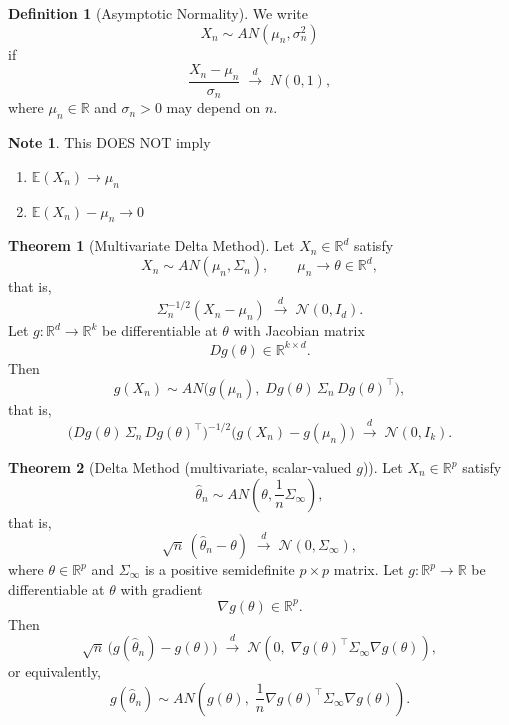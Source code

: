 \documentclass[11pt]{article}
\theoremstyle{definition}
\newtheorem{defn}{Definition}[section]
\newtheorem{note}{Note}[section]
\newtheorem{theo}{Theorem}[section]
\begin{document}
\begin{defn}[Asymptotic Normality]
We write
\[
X_n \sim AN(\mu_n, \sigma_n^2)
\]
if
\[
\frac{X_n - \mu_n}{\sigma_n}
\;\xrightarrow{d}\; N(0,1),
\]
where $\mu_n \in \mathbb{R}$ and $\sigma_n > 0$ may depend on $n$.
\end{defn}
\begin{note}
    This DOES NOT imply
    \begin{enumerate}
        \item $\mathbb{E}(X_n)\rightarrow\mu_n$
        \item $\mathbb{E}(X_n)-\mu_n\rightarrow0$
    \end{enumerate}
\end{note}
\begin{theo}[Multivariate Delta Method]
Let $X_n \in \mathbb{R}^d$ satisfy
\[
X_n\sim AN(\mu_n, \Sigma_n),
\qquad \mu_n \to \theta \in \mathbb{R}^d,
\]
that is,
\[
\Sigma_n^{-1/2}(X_n - \mu_n)
\;\xrightarrow{d}\; \mathcal{N}(0, I_d).
\]
Let $g:\mathbb{R}^d \to \mathbb{R}^k$ be differentiable at $\theta$ with Jacobian matrix
\[
Dg(\theta) \in \mathbb{R}^{k \times d}.
\]
Then
\[
g(X_n) \sim AN\!\big( g(\mu_n), \; Dg(\theta)\, \Sigma_n \, Dg(\theta)^\top \big),
\]
that is,
\[
\big( Dg(\theta)\, \Sigma_n \, Dg(\theta)^\top \big)^{-1/2}
\big( g(X_n) - g(\mu_n) \big)
\;\xrightarrow{d}\; \mathcal{N}(0, I_k).
\]
\end{theo}

\begin{theo}[Delta Method (multivariate, scalar-valued $g$)]
Let $X_n \in \mathbb{R}^p$ satisfy
\[
\hat{\theta}_n \sim AN\!\left(\theta, \frac{1}{n}\Sigma_\infty\right),
\]
that is,
\[
\sqrt{n}\,(\hat{\theta}_n - \theta)
\;\xrightarrow{d}\; \mathcal{N}(0, \Sigma_\infty),
\]
where $\theta \in \mathbb{R}^p$ and $\Sigma_\infty$ is a positive semidefinite $p\times p$ matrix.  
Let $g:\mathbb{R}^p \to \mathbb{R}$ be differentiable at $\theta$ with gradient
\[
\nabla g(\theta) \in \mathbb{R}^p.
\]
Then
\[
\sqrt{n}\,\big( g(\hat{\theta}_n) - g(\theta) \big)
\;\xrightarrow{d}\;
\mathcal{N}\!\left( 0, \; \nabla g(\theta)^\top \Sigma_\infty \nabla g(\theta) \right),
\]
or equivalently,
\[
g(\hat{\theta}_n) \sim AN\!\left( g(\theta), \; \frac{1}{n}\nabla g(\theta)^\top \Sigma_\infty \nabla g(\theta) \right).
\]
\end{theo}
\end{document}
